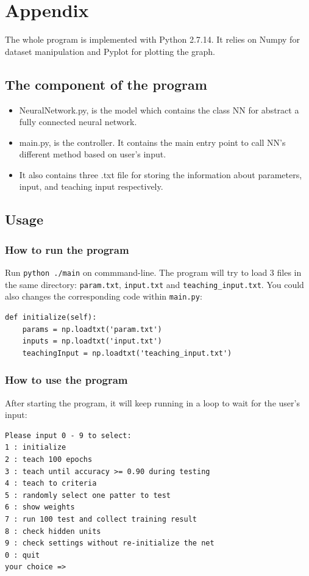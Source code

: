 \documentclass[11pt]{article}
\begin{document}
\section{Appendix}
\label{sec-5}
The whole program is implemented with Python 2.7.14. It relies on Numpy for dataset manipulation and Pyplot for plotting the graph.
\subsection{The component of the program}
\label{sec-5-1}
\begin{itemize}
\item NeuralNetwork.py, is the model which contains the class NN for abstract a fully connected neural network.
\item main.py, is the controller. It contains the main entry point to call NN's different method based on user's input.
\item It also contains three .txt file for storing the information about parameters, input, and teaching input respectively.
\end{itemize}
\subsection{Usage}
\label{sec-5-2}
\subsubsection{How to run the program}
\label{sec-5-2-1}
Run \texttt{python ./main} on commmand-line.
The program will try to load 3 files in the same directory: \texttt{param.txt}, \texttt{input.txt} and \texttt{teaching\_input.txt}. You could also changes the corresponding code within \texttt{main.py}:
\begin{verbatim}
def initialize(self):
    params = np.loadtxt('param.txt')
    inputs = np.loadtxt('input.txt')
    teachingInput = np.loadtxt('teaching_input.txt')
\end{verbatim}
\subsubsection{How to use the program}
\label{sec-5-2-2}
After starting the program, it will keep running in a loop to wait for the user's input:
\begin{verbatim}
Please input 0 - 9 to select:
1 : initialize
2 : teach 100 epochs
3 : teach until accuracy >= 0.90 during testing
4 : teach to criteria
5 : randomly select one patter to test
6 : show weights
7 : run 100 test and collect training result
8 : check hidden units
9 : check settings without re-initialize the net
0 : quit
your choice =>
\end{verbatim}
\end{document}
